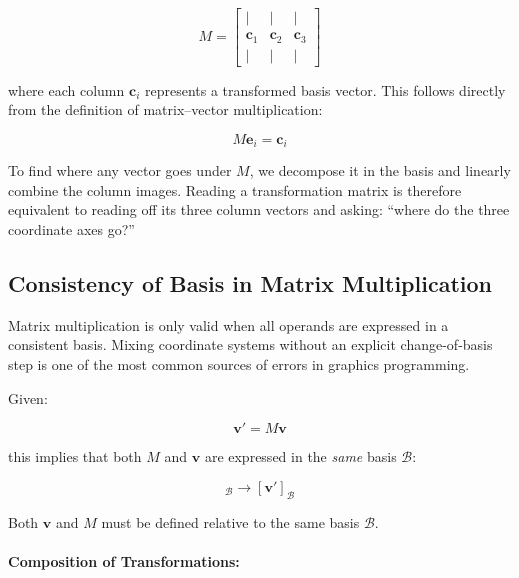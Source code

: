 \documentclass[11pt]{article}
\begin{document}
\begin{equation}
    M =
    \begin{bmatrix}
        | & | & | \\
        \mathbf{c}_1 & \mathbf{c}_2 & \mathbf{c}_3 \\
        | & | & |
    \end{bmatrix}
\end{equation}

where each column $\mathbf{c}_i$ represents a transformed basis vector. This follows directly from the definition of matrix--vector multiplication:

\begin{equation}
    M \mathbf{e}_i = \mathbf{c}_i
\end{equation}

To find where any vector goes under $M$, we decompose it in the basis and linearly combine the column images. Reading a transformation matrix is therefore equivalent to reading off its three column vectors and asking: ``where do the three coordinate axes go?''

\subsection{Consistency of Basis in Matrix Multiplication}

Matrix multiplication is only valid when all operands are expressed in a consistent basis. Mixing coordinate systems without an explicit change-of-basis step is one of the most common sources of errors in graphics programming.

Given:

\begin{equation}
    \mathbf{v}' = M \mathbf{v}
\end{equation}

this implies that both $M$ and $\mathbf{v}$ are expressed in the \emph{same} basis $\mathcal{B}$:

\begin{equation}
    [\mathbf{v}]_{\mathcal{B}} \rightarrow [\mathbf{v}']_{\mathcal{B}}
\end{equation}

Both $\mathbf{v}$ and $M$ must be defined relative to the same basis $\mathcal{B}$.

\paragraph{Composition of Transformations:}
\end{document}
